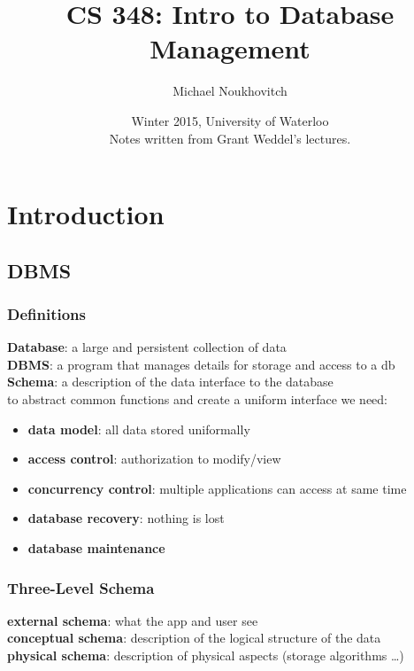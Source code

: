 \documentclass[]{article}
\theoremstyle{definition}
\begin{document}
	\let\ref\Cref

	\title{\bf{CS 348: Intro to Database Management}}
	\date{Winter 2015, University of Waterloo \\ \center Notes written from Grant Weddel's lectures.}
	\author{Michael Noukhovitch}

	\maketitle
	\newpage
	\tableofcontents
	\newpage

	\section{Introduction}
		\subsection{DBMS}
			\subsubsection{Definitions}
				\textbf{Database}: a large and persistent collection of data \\
				\textbf{DBMS}: a program that manages details for storage and access to a db \\
				\textbf{Schema}: a description of the data interface to the database \\
				to abstract common functions and create a uniform interface we need:
				\begin{itemize}
					\item \textbf{data model}: all data stored uniformally
					\item \textbf{access control}: authorization to modify/view
					\item \textbf{concurrency control}: multiple applications can access at same time 
					\item \textbf{database recovery}: nothing is lost 
					\item \textbf{database maintenance}
				\end{itemize}
			\subsubsection{Three-Level Schema}
				\textbf{external schema}: what the app and user see \\
				\textbf{conceptual schema}: description of the logical structure of the data \\
				\textbf{physical schema}: description of physical aspects (storage
	algorithms \ldots{}) \\
	
\end{document}
